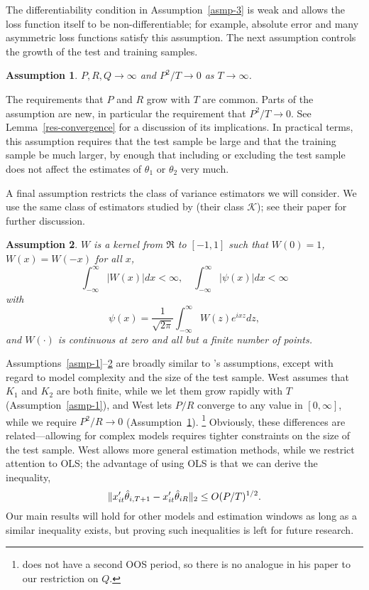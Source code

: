 \documentclass[11pt]{article}
\newtheorem{asmp}{Assumption}
\newcommand{\citepos}[1]{\citeauthor{#1}'s \citeyearpar{#1}}
\begin{document}
The differentiability condition in Assumption~\ref{asmp-3} is weak and
allows the loss function itself to be non-differentiable; for example,
absolute error and many asymmetric loss functions satisfy this
assumption.  The next assumption controls the growth of the test and
training samples.
\begin{asmp} \label{asmp-4} $P, R, Q \to\infty$ and $P^2/T \to 0$ as
  $T \to \infty$.
\end{asmp}

The requirements that $P$ and $R$ grow with $T$ are common. Parts of
the assumption are new, in particular the requirement that $P^2/T \to
0$.  See Lemma~\ref{res-convergence} for a discussion of its
implications.  In practical terms, this assumption requires that the
test sample be large and that the training sample be much larger, by
enough that including or excluding the test sample does not affect the
estimates of $\theta_1$ or $\theta_2$ very much.

A final assumption restricts the class of variance estimators we will
consider.  We use the same class of estimators studied by
\citet{JoD:00} (their class $\mathcal{K}$); see
their paper for further discussion.

\begin{asmp}
  \label{asmp-5} $W$ is a kernel from
$\Re$ to $[-1,1]$ such that $W(0) = 1$, $W(x) = W(-x)$ for all $x$,
\begin{equation*}
  \int_{-\infty}^{\infty} \lvert W(x) \rvert dx < \infty, \quad
  \int_{-\infty}^{\infty} \lvert \psi(x) \rvert dx < \infty
\end{equation*}
with
\begin{equation*}
  \psi(x) = \frac1{\sqrt{2\pi}} \int_{-\infty}^{\infty} W(z) e^{ixz}dz,
\end{equation*}
and $W(\cdot)$ is continuous at zero and all but a finite number of
points.
\end{asmp}

Assumptions~\ref{asmp-1}--\ref{asmp-5} are broadly similar to
\citepos{Wes:96} assumptions, except with regard to model complexity
and the size of the test sample.  West assumes that $K_1$ and $K_2$
are both finite, while we let them grow rapidly with $T$
(Assumption~\ref{asmp-1}), and West lets $P/R$ converge to any value
in $[0,\infty]$, while we require $P^2/R \to 0$
(Assumption~\ref{asmp-4}).%
\footnote{\citet{Wes:96} does not have a
  second OOS period, so there is no analogue in his paper to our
  restriction on $Q$.} %
Obviously, these differences are
related---allowing for complex models requires tighter constraints on
the size of the test sample.  West allows more general estimation
methods, while we restrict attention to OLS; the advantage of using
OLS is that we can derive the inequality,
\begin{equation*}
  \| x_{it}'\hat\theta_{i,T+1} - x_{it}'\hat\theta_{iR} \|_2 \leq O(P/T)^{1/2}.
\end{equation*}
Our main results will hold for other models and estimation windows as
long as a similar inequality exists, but proving such inequalities is
left for future research.
\end{document}
